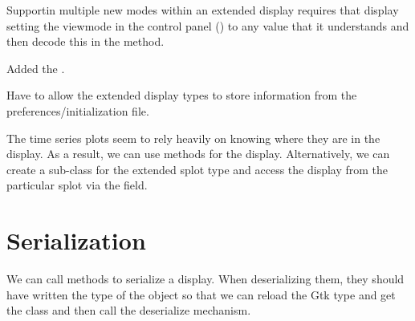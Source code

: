 \documentclass{article}
\begin{document}
Supportin multiple new modes within an extended display requires that
display setting the viewmode in the control panel
() to any value that it understands and then
decode this in the  method.

Added the .



Have to allow the extended display types to store information from
the preferences/initialization file.


The time series plots seem to rely heavily on knowing where they are
in the display.  As a result, we can use methods for the display.
Alternatively, we can create a sub-class for the extended splot type
and access the display from the particular splot via the
 field.






\section{Serialization}

We can call methods to serialize a display.  When deserializing them,
they should have written the type of the object so that we can reload
the Gtk type and get the class and then call the deserialize
mechanism.
\end{document}
